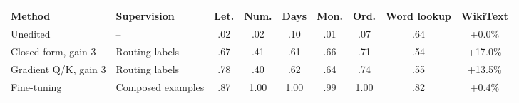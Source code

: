 \begin{tabular}{llccccccc}
\toprule
Method & Supervision & Let. & Num. & Days & Mon. & Ord. & Word lookup & WikiText \\
\midrule
Unedited & -- & .02 & .02 & .10 & .01 & .07 & .64 & +0.0\% \\
Closed-form, gain 3 & Routing labels & .67 & .41 & .61 & .66 & .71 & .54 & +17.0\% \\
Gradient Q/K, gain 3 & Routing labels & .78 & .40 & .62 & .64 & .74 & .55 & +13.5\% \\
Fine-tuning & Composed examples & .87 & 1.00 & 1.00 & .99 & 1.00 & .82 & +0.4\% \\
\bottomrule
\end{tabular}
